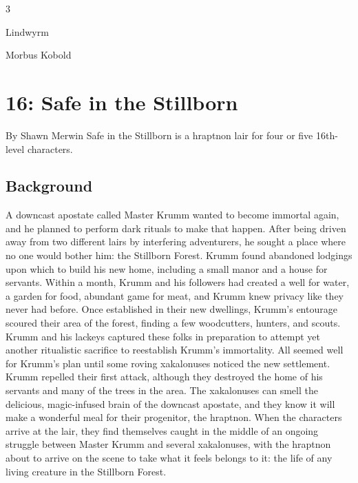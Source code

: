 \documentclass[10pt,a4paper,twoside,twocolumn,openany,bg=print,nodeprecatedcode]{dndbook}
\begin{document}
\begin{itemize}
\begin{multicols}{3}
\item Lindwyrm
\item Morbus Kobold
\end{multicols}

\end{itemize}

\chapter{16: Safe in the Stillborn}
By Shawn Merwin
Safe in the Stillborn is a hraptnon lair for four or five 16th-level characters.
\section{Background}
A downcast apostate called Master Krumm wanted to become immortal again, and he planned to perform dark rituals to make that happen. After being driven away from two different lairs by interfering adventurers, he sought a place where no one would bother him: the Stillborn Forest. Krumm found abandoned lodgings upon which to build his new home, including a small manor and a house for servants. Within a month, Krumm and his followers had created a well for water, a garden for food, abundant game for meat, and Krumm knew privacy like they never had before.
Once established in their new dwellings, Krumm's entourage scoured their area of the forest, finding a few woodcutters, hunters, and scouts. Krumm and his lackeys captured these folks in preparation to attempt yet another ritualistic sacrifice to reestablish Krumm's immortality.
All seemed well for Krumm's plan until some roving xakalonuses noticed the new settlement. Krumm repelled their first attack, although they destroyed the home of his servants and many of the trees in the area. The xakalonuses can smell the delicious, magic-infused brain of the downcast apostate, and they know it will make a wonderful meal for their progenitor, the hraptnon.
When the characters arrive at the lair, they find themselves caught in the middle of an ongoing struggle between Master Krumm and several xakalonuses, with the hraptnon about to arrive on the scene to take what it feels belongs to it: the life of any living creature in the Stillborn Forest.
\end{document}
